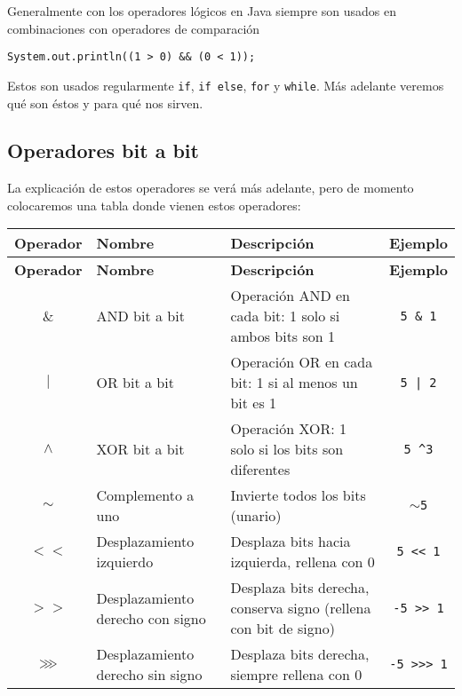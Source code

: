 \documentclass[12pt]{article}
\theoremstyle{largebreak}
\begin{document}
    Generalmente con los operadores lógicos en Java siempre son usados en combinaciones con operadores de comparación
    \begin{lstlisting}[caption={Operadores lógicos y valores.},label=DescriptiveLabel]
System.out.println((1 > 0) && (0 < 1));
    \end{lstlisting}
    Estos son usados regularmente \lstinline|if|, \lstinline|if else|, \lstinline|for| y \lstinline|while|. Más adelante veremos qué son éstos y para qué nos sirven.

    \subsection{Operadores bit a bit}

    La explicación de estos operadores se verá más adelante, pero de momento colocaremos una tabla donde vienen estos operadores:

    \begin{longtable}{c l p{} c}
    \toprule
    \textbf{Operador} & \textbf{Nombre} & \textbf{Descripción} & \textbf{Ejemplo} \\
    \midrule
    \endfirsthead

    \midrule
    \textbf{Operador} & \textbf{Nombre} & \textbf{Descripción} & \textbf{Ejemplo} \\
    \midrule
    \endhead

    \bottomrule
    \endfoot

    $\&$ & AND bit a bit & Operación AND en cada bit: 1 solo si ambos bits son 1 & \texttt{5 \& 1} \\  %
    $|$ & OR bit a bit & Operación OR en cada bit: 1 si al menos un bit es 1 & \texttt{5 | 2} \\  %
    $\wedge$ & XOR bit a bit & Operación XOR: 1 solo si los bits son diferentes & \texttt{5 \textasciicircum 3} \\  %
    $\sim$ & Complemento a uno & Invierte todos los bits (unario) & \texttt{$\sim$5} \\  %
    $<<$ & Desplazamiento izquierdo & Desplaza bits hacia izquierda, rellena con 0 & \lstinline|5 << 1| \\  %
    $>>$ & Desplazamiento derecho con signo & Desplaza bits derecha, conserva signo (rellena con bit de signo) & \lstinline|-5 >> 1| \\  %
    $\ggg$ & Desplazamiento derecho sin signo & Desplaza bits derecha, siempre rellena con 0 & \lstinline|-5 >>> 1| \\  %
    \end{longtable}
\end{document}
